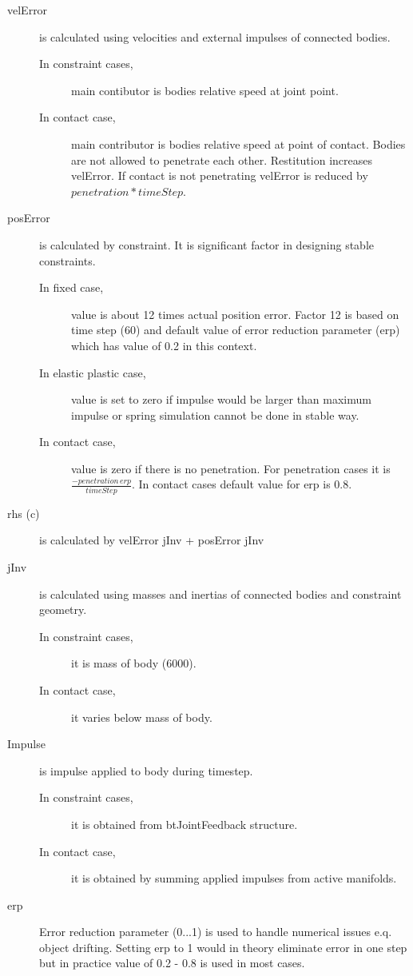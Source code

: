 \begin{description}
\item[velError] is calculated using velocities and external impulses of connected bodies.  
 \begin{description}
\item[In constraint cases,] main contibutor is bodies relative speed at joint point.
\item[In contact case,] main contributor is bodies relative speed at point of contact. 
Bodies are not allowed to penetrate each other. Restitution increases velError.
If contact is not penetrating velError is reduced by $penetration * timeStep$.
\end{description}
\item[posError] is calculated by constraint. It is significant factor in designing stable constraints.
 \begin{description}
 \item[In fixed case,] value is about 12 times actual position error. Factor 12 is based on time step (60) 
 and default value of error reduction parameter (erp) which has value of 0.2 in this context.
 \item[In elastic plastic case,]  value is set to zero if impulse would be larger than maximum impulse or
spring simulation cannot be done in stable way.
 \item[In contact case,] value is zero if there is no penetration. For penetration cases it is 
$\frac{-penetration\, erp}{timeStep}$. In contact cases default value for erp is 0.8.
 \end{description}
\item[rhs (c)] is calculated by velError jInv + posError jInv
\item[jInv] is calculated using masses and inertias of connected bodies and constraint geometry. 
 \begin{description}
\item[In constraint cases,] it is mass of body (6000).
\item[In contact case,] it varies below mass of body.
\end{description}
\item[Impulse] is impulse applied to body during timestep.
 \begin{description}
\item[In constraint cases,] it is obtained from btJointFeedback structure.
\item[In contact case,] it is obtained by summing applied impulses from active manifolds.
\end{description}
\item[erp] Error reduction parameter (0...1) is used to handle numerical issues e.q. object drifting. 
Setting erp to 1 would in theory eliminate error in one step but in practice value of 0.2 - 0.8 is used in most cases.
\end{description}

